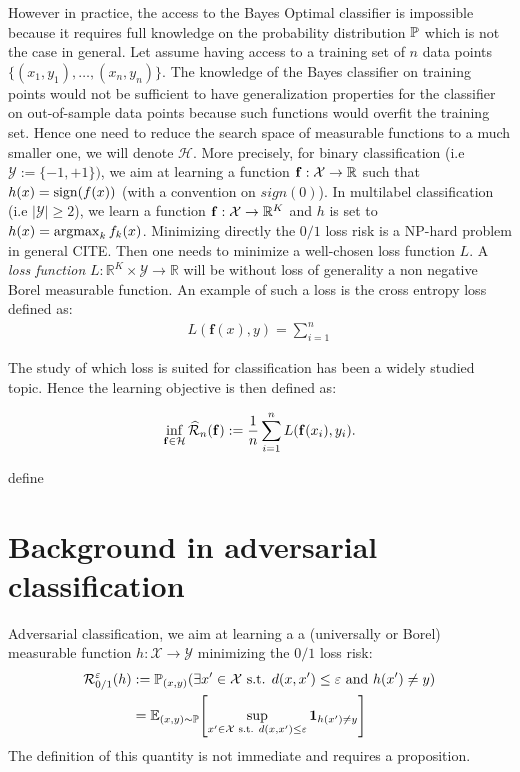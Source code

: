 However in practice, the access to the Bayes Optimal classifier is impossible because it requires full knowledge on the probability distribution $\mathbb{P}$ which is not the case in general. Let assume having access to a training set of $n$ data points $\{(x_1,y_1),\dots,(x_n,y_n)\}$. The knowledge of the Bayes classifier on training points would not be sufficient to have generalization properties for the classifier on out-of-sample data points because such functions would overfit the training set. Hence one need to reduce the search space of measurable functions to a much smaller one, we will denote $\mathcal{H}$. More precisely, for binary classification (i.e $\mathcal{Y}:=\{-1,+1\})$, we aim at learning a function $\mathbf{f}:\mathcal{X}\to\mathbb{R}$ such that $h(x)=\operatorname*{sign}(f(x))$ (with a convention on $sign(0)$). In multilabel classification (i.e $|\mathcal{Y}|\geq2$), we learn a function $\mathbf{f}:\mathcal{X}\to\mathbb{R}^K$ and $h$ is set to $h(x)=\operatorname*{argmax}_k f_k(x)$. Minimizing directly the $0/1$ loss risk is a NP-hard problem in general CITE. Then one needs to minimize a well-chosen loss function $L$. A \textit{loss function} $L:\mathbb{R}^K\times\mathcal{Y}\to\mathbb{R}$ will be without loss of generality a non negative Borel measurable function. An example of such a loss is the cross entropy loss defined as:
\begin{align*}
    L(\mathbf{f}(x),y)=\sum_{i=1}^n
\end{align*}

The study of which loss is suited for classification has been a widely studied topic. Hence the learning objective is then defined as:

\begin{align*}
\inf_{\mathbf{f}\in\mathcal{H}}\widehat{\mathcal{R}}_{n}(\mathbf{f}):= \frac{1}{n}\sum_{i=1}^nL(\mathbf{f}(x_i),y_i).
\end{align*}

define 





\section{Background in adversarial classification}
Adversarial classification, we aim at learning a a (universally or Borel) measurable function $h:\mathcal{X}\to\mathcal{Y}$ minimizing the $0/1$ loss risk: 
\begin{align*}
\risk^\varepsilon_{0/1}(h)&:=\PP_{(x,y)}(\exists x'\in\XX\text{ s.t. } d(x,x')\leq \varepsilon \text{ and } h(x')\neq y)\\
&= \EE_{(x,y)\sim\PP}\left[\sup_{x'\in\XX\text{ s.t. } d(x,x')\leq \varepsilon}\mathbf{1}_{h(x')\neq y}\right]
\end{align*}
The definition of this quantity is not immediate and requires a proposition.

